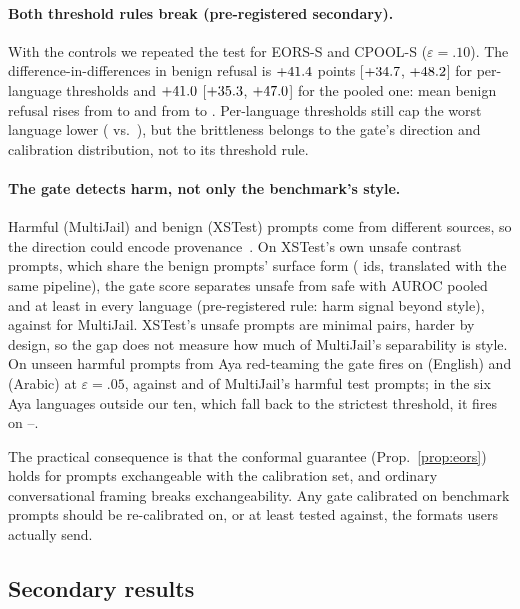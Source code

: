 \documentclass{article}
\newcommand{\ci}[2]{{\small[$#1$, $#2$]}}
\begin{document}
\paragraph{Both threshold rules break (pre-registered secondary).} With the controls we repeated the test for EORS-S and CPOOL-S ($\varepsilon{=}.10$). The difference-in-differences in benign refusal is $+41.4$ points \ci{\CtlGreetDidEorsLo}{\CtlGreetDidEorsHi} for per-language thresholds and $+41.0$ \ci{\CtlGreetDidPoolLo}{\CtlGreetDidPoolHi} for the pooled one: mean benign refusal rises from \CtlGreetBrrEors{} to \CtlGreetBrrEorsGreet{} and from \CtlGreetBrrPool{} to \CtlGreetBrrPoolGreet. Per-language thresholds still cap the worst language lower (\CtlGreetWorstEors{} vs.\ \CtlGreetWorstPool), but the brittleness belongs to the gate's direction and calibration distribution, not to its threshold rule.

\paragraph{The gate detects harm, not only the benchmark's style.} Harmful (MultiJail) and benign (XSTest) prompts come from different sources, so the direction could encode provenance~\citep{fomin2026benchmarks,wang2025falsesense}. On XSTest's own unsafe contrast prompts, which share the benign prompts' surface form (\CtlXsN{} ids, translated with the same pipeline), the gate score separates unsafe from safe with AUROC \CtlStyleAuc{} pooled and at least \CtlStyleAucMin{} in every language (pre-registered rule: harm signal beyond style), against \CtlMjAuc{} for MultiJail. XSTest's unsafe prompts are minimal pairs, harder by design, so the gap does not measure how much of MultiJail's separability is style. On unseen harmful prompts from Aya red-teaming the gate fires on \CtlOodEn{} (English) and \CtlOodAr{} (Arabic) at $\varepsilon{=}.05$, against \CtlMjFireEn{} and \CtlMjFireAr{} of MultiJail's harmful test prompts; in the six Aya languages outside our ten, which fall back to the strictest threshold, it fires on \CtlOodOtherMin--\CtlOodOtherMax.

The practical consequence is that the conformal guarantee (Prop.~\ref{prop:eors}) holds for prompts exchangeable with the calibration set, and ordinary conversational framing breaks exchangeability. Any gate calibrated on benchmark prompts should be re-calibrated on, or at least tested against, the formats users actually send.

\subsection{Secondary results}
\label{sec:secondary}
\end{document}
